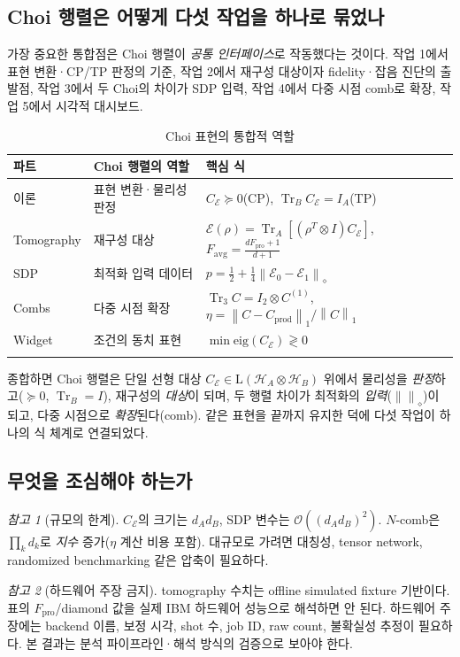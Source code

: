 \documentclass[11pt,a4paper]{article}
\newcommand{\E}{\mathcal{E}}
\newcommand{\Hcal}{\mathcal{H}}
\newcommand{\Tr}{\operatorname{Tr}}
\newcommand{\Lin}{\mathrm{L}}
\newcommand{\diamondnorm}[1]{\left\lVert #1 \right\rVert_{\diamond}}
\newcommand{\onenorm}[1]{\left\lVert #1 \right\rVert_{1}}
\theoremstyle{definition}
\theoremstyle{plain}
\theoremstyle{remark}
\newtheorem*{remark}{참고}
\begin{document}
\subsection{Choi 행렬은 어떻게 다섯 작업을 하나로 묶었나}

가장 중요한 통합점은 Choi 행렬이 \emph{공통 인터페이스}로 작동했다는 것이다. 작업 1에서 표현 변환·CP/TP 판정의 기준, 작업 2에서 재구성 대상이자 fidelity·잡음 진단의 출발점, 작업 3에서 두 Choi의 차이가 SDP 입력, 작업 4에서 다중 시점 comb로 확장, 작업 5에서 시각적 대시보드.

\begin{longtable}{p{}p{}p{}}
\toprule
파트 & Choi 행렬의 역할 & 핵심 식 \\
\midrule
이론 & 표현 변환·물리성 판정 & $C_\E\succeq0$(CP), $\Tr_B C_\E=I_A$(TP) \\
Tomography & 재구성 대상 & $\E(\rho)=\Tr_A[(\rho^T\otimes I)C_\E]$, $F_{\mathrm{avg}}=\frac{dF_{\mathrm{pro}}+1}{d+1}$ \\
SDP & 최적화 입력 데이터 & $p=\tfrac12+\tfrac14\diamondnorm{\E_0-\E_1}$ \\
Combs & 다중 시점 확장 & $\Tr_3 C=I_2\otimes C^{(1)}$, $\eta=\onenorm{C-C_{\mathrm{prod}}}/\onenorm{C}$ \\
Widget & 조건의 동치 표현 & $\min\mathrm{eig}(C_\E)\gtrless0$ \\
\bottomrule
\caption{Choi 표현의 통합적 역할}
\label{tab:integration}
\end{longtable}

종합하면 Choi 행렬은 단일 선형 대상 $C_\E\in\Lin(\Hcal_A\otimes\Hcal_B)$ 위에서 물리성을 \emph{판정}하고($\succeq0$, $\Tr_B=I$), 재구성의 \emph{대상}이 되며, 두 행렬 차이가 최적화의 \emph{입력}($\diamondnorm{}$)이 되고, 다중 시점으로 \emph{확장}된다(comb). 같은 표현을 끝까지 유지한 덕에 다섯 작업이 하나의 식 체계로 연결되었다.

\subsection{무엇을 조심해야 하는가}

\begin{remark}[규모의 한계]
$C_\E$의 크기는 $d_Ad_B$, SDP 변수는 $\mathcal O((d_Ad_B)^2)$. $N$-comb은 $\prod_k d_k$로 \emph{지수} 증가($\eta$ 계산 비용 포함). 대규모로 가려면 대칭성, tensor network, randomized benchmarking 같은 압축이 필요하다.
\end{remark}

\begin{remark}[하드웨어 주장 금지]
tomography 수치는 offline simulated fixture 기반이다. 표의 $F_{\mathrm{pro}}$/diamond 값을 실제 IBM 하드웨어 성능으로 해석하면 안 된다. 하드웨어 주장에는 backend 이름, 보정 시각, shot 수, job ID, raw count, 불확실성 추정이 필요하다. 본 결과는 분석 파이프라인·해석 방식의 검증으로 보아야 한다.
\end{remark}
\end{document}
